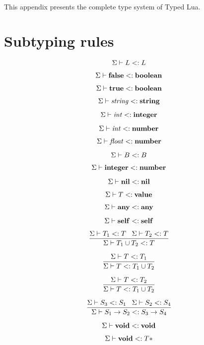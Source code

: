This appendix presents the complete type system of Typed Lua.

\section{Subtyping rules}

\noindent

\[
\Sigma \vdash L <: L
\]

\[
\Sigma \vdash \mathbf{false} <: \mathbf{boolean}
\]

\[
\Sigma \vdash \mathbf{true} <: \mathbf{boolean}
\]

\[
\Sigma \vdash {\it string} <: \mathbf{string}
\]

\[
\Sigma \vdash {\it int} <: \mathbf{integer}
\]

\[
\Sigma \vdash {\it int} <: \mathbf{number}
\]

\[
\Sigma \vdash {\it float} <: \mathbf{number}
\]

\[
\Sigma \vdash B <: B
\]

\[
\Sigma \vdash \mathbf{integer} <: \mathbf{number}
\]

\[
\Sigma \vdash \mathbf{nil} <: \mathbf{nil}
\]

\[
\Sigma \vdash T <: \mathbf{value}
\]

\[
\Sigma \vdash \mathbf{any} <: \mathbf{any}
\]

\[
\Sigma \vdash \mathbf{self} <: \mathbf{self}
\]

\[
\dfrac{\Sigma \vdash T_{1} <: T \;\;\;
       \Sigma \vdash T_{2} <: T}
      {\Sigma \vdash T_{1} \cup T_{2} <: T}
\]

\[
\dfrac{\Sigma \vdash T <: T_{1}}
      {\Sigma \vdash T <: T_{1} \cup T_{2}}
\]

\[
\dfrac{\Sigma \vdash T <: T_{2}}
      {\Sigma \vdash T <: T_{1} \cup T_{2}}
\]

\[
\dfrac{\Sigma \vdash S_{3} <: S_{1} \;\;\;
       \Sigma \vdash S_{2} <: S_{4}}
      {\Sigma \vdash S_{1} \rightarrow S_{2} <: S_{3} \rightarrow S_{4}}
\]

\[
\Sigma \vdash \mathbf{void} <: \mathbf{void}
\]

\[
\Sigma \vdash \mathbf{void} <: T{*}
\]

